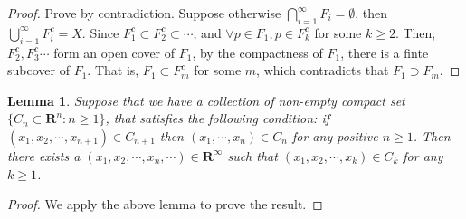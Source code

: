 \documentclass[11pt,english]{smfart}
\newtheorem{lemma}[theorem]{Lemma}
\newcommand{\mf}{\mathbf}
\begin{document}
\begin{proof}
    Prove by contradiction. Suppose otherwise $\bigcap_{i=1}^\infty F_i = \emptyset$, then $\bigcup_{i=1}^\infty F_i^c = X$. Since $F_1^c \subset F_2^c \subset \cdots$, and $\forall p\in F_1, p \in F_k^c $ for some $k\geq 2$. Then, $F_2^c,F_3^c\cdots$ form an open cover of $F_1$, by the compactness of $F_1$, there is a finte subcover of $F_1$. That is, $F_1 \subset F_m^c$ for some $m$, which contradicts that $F_1 \supset F_m$.
\end{proof}

\begin{lemma}
    Suppose that we have a collection of non-empty compact set $\{C_n \subset \mf{R}^n: n \geq 1\}$, that satisfies the following condition: if $(x_1,x_2,\cdots,x_{n+1}) \in C_{n+1}$ then $(x_1,\cdots,x_n)\in C_n$ for any positive $n \geq 1$. Then there exists a $(x_1,x_2,\cdots,x_n,\cdots) \in \mf{R}^\infty$ such that $(x_1,x_2,\cdots,x_k) \in C_k$ for any $k\geq 1$.
\end{lemma}

\begin{proof}
    We apply the above lemma to prove the result.
\end{proof}
\end{document}
